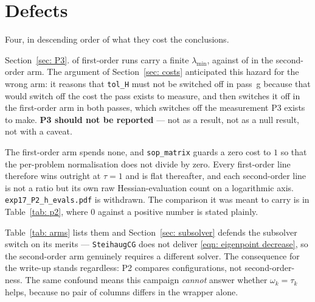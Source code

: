 \documentclass[11pt,a4paper]{article}
\theoremstyle{remark}
\begin{document}
\section{Defects}\label{sec: defects}

Four, in descending order of what they cost the conclusions.

\begin{description}[leftmargin=1.8em, style=nextline]
  \item[D1. P3's first-order columns are an instrumentation artefact.]
    Section~\ref{sec: P3}. \NLamFoFinite{} of \NLamFoTotal{} first-order runs
    carry a finite $\lambda_{\min}$, against \NLamSoFinite{} of \NLamSoTotal{} in
    the second-order arm. The argument of Section~\ref{sec: costs} anticipated
    this hazard for the wrong arm: it reasons that \texttt{tol\_H} must not be
    switched off in pass~g because that would switch off the cost the pass exists
    to measure, and then switches it off in the first-order arm in both passes,
    which switches off the measurement P3 exists to make. \textbf{P3 should not be
    reported} --- not as a result, not as a null result, not with a caveat.
  \item[D2. The P2 profile on Hessian evaluations is degenerate.] The first-order
    arm spends none, and \texttt{sop\_matrix} guards a zero cost to $1$ so that the
    per-problem normalisation does not divide by zero. Every first-order line
    therefore wins outright at $\tau = 1$ and is flat thereafter, and each
    second-order line is not a ratio but its own raw Hessian-evaluation count on a
    logarithmic axis. \texttt{exp17\_P2\_h\_evals.pdf} is withdrawn. The
    comparison it was meant to carry is in Table~\ref{tab: p2}, where $0$ against
    a positive number is stated plainly.
  \item[D3. The two arms differ in three ways at once.] Table~\ref{tab: arms}
    lists them and Section~\ref{sec: subsolver} defends the subsolver switch on
    its merits --- \texttt{SteihaugCG} does not deliver
    \eqref{eqn: eigenpoint decrease}, so the second-order arm genuinely requires a
    different solver. The consequence for the write-up stands regardless: P2
    compares configurations, not second-order-ness. The same confound means this
    campaign \emph{cannot} answer whether $\omega_k = \tau_k$ helps, because no
    pair of columns differs in the wrapper alone.

\end{description}
\end{document}
